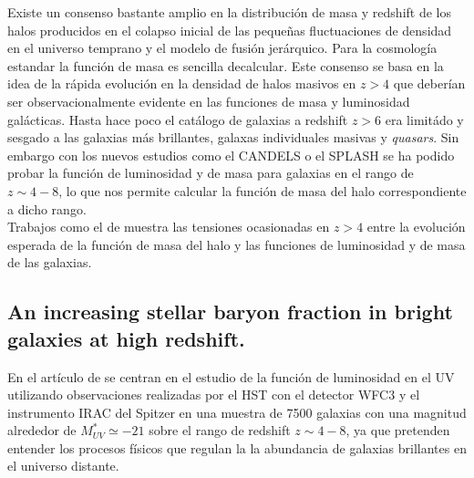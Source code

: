 \documentclass{article}
\begin{document}
Existe un consenso bastante amplio en la distribución de masa y redshift de los halos producidos en el colapso inicial de las pequeñas fluctuaciones de densidad en el universo temprano y el modelo de fusión jerárquico. Para la cosmología estandar la función de masa es sencilla decalcular. Este consenso se basa en la idea de la rápida evolución en la densidad de halos masivos en $z>4$ que deberían ser observacionalmente evidente en las funciones de masa y luminosidad galácticas. Hasta hace poco el catálogo de galaxias a redshift $z>6$ era limitádo y sesgado a las galaxias más brillantes, galaxas individuales masivas y \textit{quasars}. Sin embargo con los nuevos estudios como el CANDELS o el SPLASH se ha podido probar la función de luminosidad y de masa para galaxias en el rango de $z\sim 4-8$, lo que nos permite calcular la función de masa del halo correspondiente a dicho rango.\\

Trabajos como el de \cite{finkelstein2015increasing} muestra las tensiones ocasionadas en $z>4$ entre la evolución esperada de la función de masa del halo y las funciones de luminosidad y de masa de las galaxias. \\

\subsection*{An increasing stellar baryon fraction in bright galaxies at high redshift.}
En el artículo de \cite{finkelstein2015increasing} se centran en el estudio de la función de luminosidad en el UV utilizando observaciones realizadas por el HST con el detector WFC3 y el instrumento IRAC del Spitzer en una muestra de 7500 galaxias con una magnitud alrededor de $M_{UV}^*\simeq -21$ sobre el rango de redshift $z\sim 4-8$, ya que pretenden entender los procesos físicos que regulan la la abundancia de galaxias brillantes en el universo distante. \\
\end{document}
